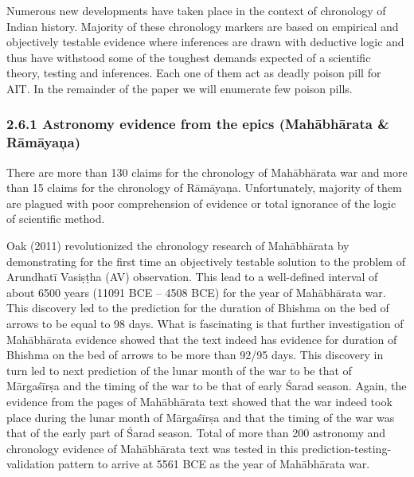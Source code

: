 \newpage

Numerous new developments have taken place in the context of chronology of Indian history. Majority of these chronology markers are based on empirical and objectively testable evidence where inferences are drawn with deductive logic and thus have withstood some of the toughest demands expected of a scientific theory, testing and inferences. Each one of them act as deadly poison pill for AIT. In the remainder of the paper we will enumerate few poison pills.

\subsubsection*{2.6.1 Astronomy evidence from the epics (Mahābhārata \& Rāmāyaņa)}

There are more than 130 claims for the chronology of Mahābhārata war and more than 15 claims for the chronology of Rāmāyaņa. Unfortunately, majority of them are plagued with poor comprehension of evidence or total ignorance of the logic of scientific method.

Oak (2011) revolutionized the chronology research of Mahābhārata by demonstrating for the first time an objectively testable solution to the problem of Arundhatī Vasiṣṭha (AV) observation. This lead to a well-defined interval of about 6500 years (11091 BCE – 4508 BCE) for the year of Mahābhārata war. This discovery led to the prediction for the duration of Bhishma on the bed of arrows to be equal to 98 days. What is fascinating is that further investigation of Mahābhārata evidence showed that the text indeed has evidence for duration of Bhishma on the bed of arrows to be more than 92/95 days. This discovery in turn led to next prediction of the lunar month of the war to be that of Mārgaśīrṣa and the timing of the war to be that of early Śarad season. Again, the evidence from the pages of Mahābhārata text showed that the war indeed took place during the lunar month of Mārgaśīrṣa and that the timing of the war was that of the early part of Śarad season. Total of more than 200 astronomy and chronology evidence of Mahābhārata text was tested in this prediction-testing-validation pattern to arrive at 5561 BCE as the year of Mahābhārata war.

